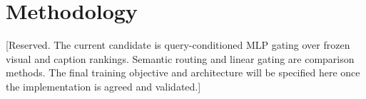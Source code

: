 \section{Methodology}

[Reserved. The current candidate is query-conditioned MLP gating over frozen visual and caption rankings. Semantic routing and linear gating are comparison methods. The final training objective and architecture will be specified here once the implementation is agreed and validated.]

